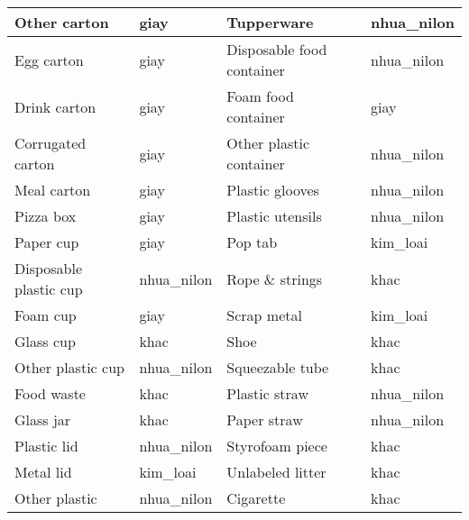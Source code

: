 \documentclass[../the.tex]{subfiles}
\begin{document}
\begin{table}[!ht]
\begin{tabular}{|l|l|l|l|}
		Other carton           & giay                                  & Tupperware                & nhua\_nilon \\ \hline
		Egg carton             & giay                                  & Disposable food container & nhua\_nilon \\ \hline
		Drink carton           & giay                                  & Foam food container       & giay        \\ \hline
		Corrugated carton      & giay                                  & Other plastic container   & nhua\_nilon \\ \hline
		Meal carton            & giay                                  & Plastic glooves           & nhua\_nilon \\ \hline
		Pizza box              & giay                                  & Plastic utensils          & nhua\_nilon \\ \hline
		Paper cup              & giay                                  & Pop tab                   & kim\_loai   \\ \hline
		Disposable plastic cup & nhua\_nilon                           & Rope \& strings           & khac        \\ \hline
		Foam cup               & giay                                  & Scrap metal               & kim\_loai   \\ \hline
		Glass cup              & khac                                  & Shoe                      & khac        \\ \hline
		Other plastic cup      & nhua\_nilon                           & Squeezable tube           & khac        \\ \hline
		Food waste             & khac                                  & Plastic straw             & nhua\_nilon \\ \hline
		Glass jar              & khac                                  & Paper straw               & nhua\_nilon \\ \hline
		Plastic lid            & nhua\_nilon                           & Styrofoam piece           & khac        \\ \hline
		Metal lid              & kim\_loai                             & Unlabeled litter          & khac        \\ \hline
		Other plastic          & nhua\_nilon                           & Cigarette                 & khac        \\ \hline
	\end{tabular}
	\label{tab:taco_map}
\end{table}
\end{document}
